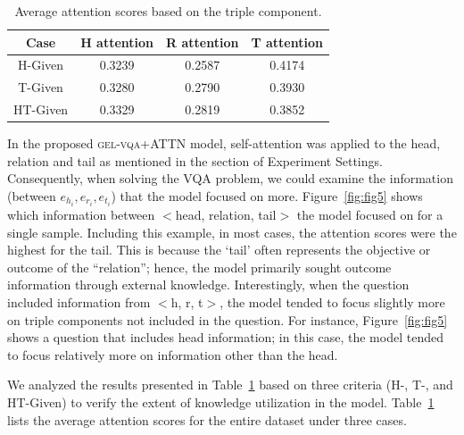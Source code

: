 \documentclass[letterpaper]{article} %
\begin{document}
\begin{table}[h]
\centering
\small

\begin{tabular}{cccc}
\toprule
Case              & H attention   & R attention  & T attention   \\
\midrule
H-Given           & 0.3239        & 0.2587       &0.4174       \\
T-Given           & 0.3280        & 0.2790       &0.3930         \\
HT-Given          & 0.3329        & 0.2819       &0.3852         \\
\bottomrule
\end{tabular}
\caption{Average attention scores based on the triple component.}
\label{tab:attn-score}
\end{table}

In the proposed \textsc{gel-vqa}+ATTN model, self-attention \cite{vaswani2017attention} was applied to the head, relation and tail as mentioned in the section of Experiment Settings.
Consequently, when solving the VQA problem, we could examine the information (between ${e_{h_i}, e_{r_i}, e_{t_i}}$) that the model focused on more. Figure~\ref{fig:fig5} shows which information between $<$head, relation, tail$>$ the model focused on for a single sample. Including this example, in most cases, the attention scores were the highest for the tail. This is because the `tail' often represents the objective or outcome of the ``relation''; hence, the model primarily sought outcome information through external knowledge. Interestingly, when the question included information from $<$h, r, t$>$, the model tended to focus slightly more on triple components not included in the question. For instance, Figure~\ref{fig:fig5} shows a question that includes head information; in this case, the model tended to focus relatively more on information other than the head.


We analyzed the results presented in Table~\ref{tab:attn-score} based on three criteria (H-, T-, and HT-Given) to verify the extent of knowledge utilization in the model. Table~\ref{tab:attn-score} lists the average attention scores for the entire dataset under three cases.
\end{document}
